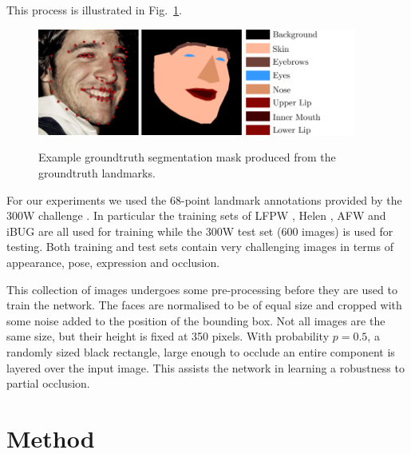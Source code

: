 This process is illustrated in Fig.~\ref{fig:gtmasks}.

\begin{figure}
\centering
\includegraphics[height=3.5cm]{figs/gtmasks.pdf}
\hspace{-1.4mm}
\includegraphics[height=3.5cm]{figs/gtmasks_key.pdf}
\caption[Example groundtruth facial part masks]{Example groundtruth
  segmentation mask produced from the groundtruth landmarks.}
\label{fig:gtmasks}
\end{figure}

For our experiments we used the 68-point landmark annotations provided
by the 300W challenge \cite{sagonas2013300}. In particular the
training sets of LFPW \cite{belhumeur2011localizing}, Helen
\cite{le2012interactive}, AFW \cite{zhu2012face} and iBUG
\cite{sagonas2013300} are all used for training while the 300W test
set (600 images) is used for testing. Both training and test sets
contain very challenging images in terms of appearance, pose,
expression and occlusion.

This collection of images undergoes some pre-processing before they
are used to train the network. The faces are normalised to be of equal
size and cropped with some noise added to the position of the bounding
box. Not all images are the same size, but their height is fixed at
350 pixels. With probability $p=0.5$, a randomly sized black
rectangle, large enough to occlude an entire component is layered over
the input image. This assists the network in learning a robustness to
partial occlusion.



\section{Method}
\label{sec:proposed}


